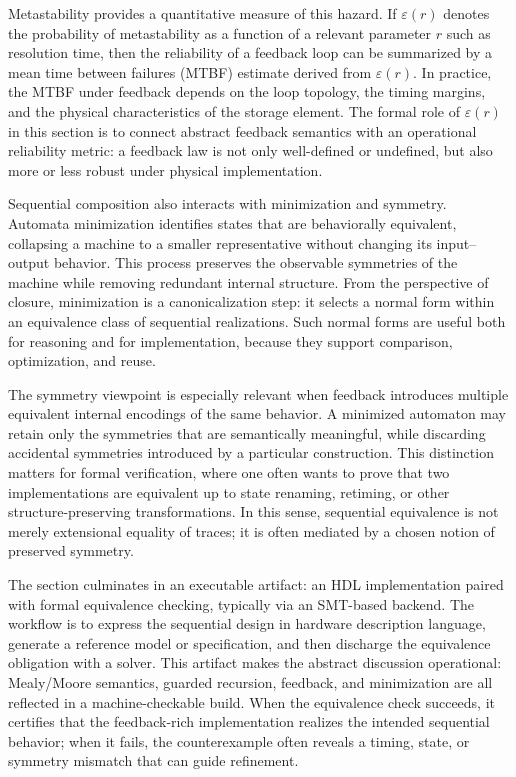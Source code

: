Metastability provides a quantitative measure of this hazard. If \(\varepsilon(r)\) denotes the probability of metastability as a function of a relevant parameter \(r\) such as resolution time, then the reliability of a feedback loop can be summarized by a mean time between failures (MTBF) estimate derived from \(\varepsilon(r)\). In practice, the MTBF under feedback depends on the loop topology, the timing margins, and the physical characteristics of the storage element. The formal role of \(\varepsilon(r)\) in this section is to connect abstract feedback semantics with an operational reliability metric: a feedback law is not only well-defined or undefined, but also more or less robust under physical implementation.

Sequential composition also interacts with minimization and symmetry. Automata minimization identifies states that are behaviorally equivalent, collapsing a machine to a smaller representative without changing its input--output behavior. This process preserves the observable symmetries of the machine while removing redundant internal structure. From the perspective of closure, minimization is a canonicalization step: it selects a normal form within an equivalence class of sequential realizations. Such normal forms are useful both for reasoning and for implementation, because they support comparison, optimization, and reuse.

The symmetry viewpoint is especially relevant when feedback introduces multiple equivalent internal encodings of the same behavior. A minimized automaton may retain only the symmetries that are semantically meaningful, while discarding accidental symmetries introduced by a particular construction. This distinction matters for formal verification, where one often wants to prove that two implementations are equivalent up to state renaming, retiming, or other structure-preserving transformations. In this sense, sequential equivalence is not merely extensional equality of traces; it is often mediated by a chosen notion of preserved symmetry.

The section culminates in an executable artifact: an HDL implementation paired with formal equivalence checking, typically via an SMT-based backend. The workflow is to express the sequential design in hardware description language, generate a reference model or specification, and then discharge the equivalence obligation with a solver. This artifact makes the abstract discussion operational: Mealy/Moore semantics, guarded recursion, feedback, and minimization are all reflected in a machine-checkable build. When the equivalence check succeeds, it certifies that the feedback-rich implementation realizes the intended sequential behavior; when it fails, the counterexample often reveals a timing, state, or symmetry mismatch that can guide refinement.

